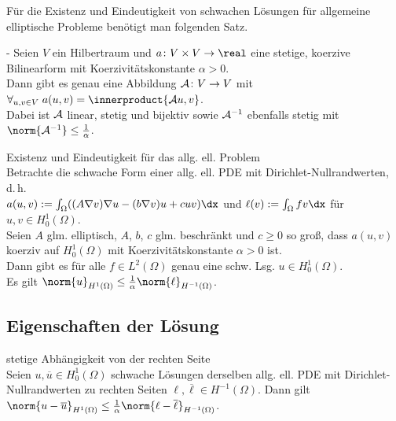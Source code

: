 \begin{Bem}
    Für die Existenz und Eindeutigkeit von schwachen Lösungen für allgemeine elliptische Probleme
    benötigt man folgenden Satz.
\end{Bem}

\begin{Satz}{-}
    Seien $V$ ein Hilbertraum und
    $a \colon V \times V \to \real$ eine stetige, koerzive Bilinearform mit
    Koerzivitätskonstante $\alpha > 0$.\\
    Dann gibt es genau eine Abbildung $\mathcal{A}\colon V \to V$ mit
    $\forall_{u, v \in V}\; a(u, v) = \innerproduct{\A u, v}$.\\
    Dabei ist $\mathcal{A}$ linear, stetig und bijektiv sowie $\mathcal{A}^{-1}$ ebenfalls stetig mit
    $\norm{\A^{-1}} \le \frac{1}{\alpha}$.
\end{Satz}

\linie

\begin{Satz}{Existenz und Eindeutigkeit für das allg. ell. Problem}\\
    Betrachte die schwache Form einer allg. ell. PDE mit Dirichlet-Nullrandwerten, d.\,h.\\
    $a(u, v) := \int_\Omega ((A\nabla v) \nabla u - (b \nabla v) u + cuv) \dx$
    und $\ell(v) := \int_\Omega fv \dx$ für $u, v \in H^1_0(\Omega)$.\\
    Seien $A$ glm. elliptisch, $A$, $b$, $c$ glm. beschränkt und
    $c \ge 0$ so groß, dass $a(u, v)$ koerziv auf $H^1_0(\Omega)$ mit Koerzivitätskonstante
    $\alpha > 0$ ist.\\
    Dann gibt es für alle $f \in L^2(\Omega)$ genau eine schw. Lsg. $u \in H^1_0(\Omega)$.\\
    Es gilt $\norm{u}_{H^1(\Omega)} \le \frac{1}{\alpha} \norm{\ell}_{H^{-1}(\Omega)}$.
\end{Satz}

\subsection{%
    Eigenschaften der Lösung%
}

\begin{Satz}{stetige Abhängigkeit von der rechten Seite}\\
    Seien $u, \overline{u} \in H^1_0(\Omega)$ schwache Lösungen derselben allg. ell. PDE
    mit Dirichlet-Nullrandwerten zu rechten Seiten $\ell, \overline{\ell} \in H^{-1}(\Omega)$.
    Dann gilt $\norm{u - \overline{u}}_{H^1(\Omega)} \le
    \frac{1}{\alpha} \norm{\ell - \overline{\ell}}_{H^{-1}(\Omega)}$.
\end{Satz}

